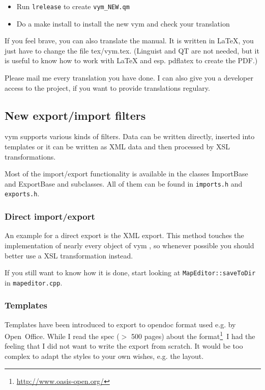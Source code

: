 \documentclass[12pt,a4paper]{article}
\newcommand{\vym}{{\sc vym }}
\begin{document}
\begin{appendix}
\begin{itemize}
	\item Run {\tt lrelease} to create {\tt vym\_NEW.qm}

	\item Do a make install to install the new vym and check your translation
\end{itemize}

If you feel brave, you can also translate the manual. It is written in
LaTeX, you just have to change the file tex/vym.tex. (Linguist and QT
are not needed, but it is useful to know how to work with LaTeX and esp.
pdflatex to create the PDF.) 

Please mail me every translation you have done. I can also give you a
developer access to the project, if you want to provide translations
regulary.  

\subsection{New export/import filters}
\vym supports various kinds of filters. Data can be written directly,
inserted into templates or it can be written as XML data and then
processed by XSL transformations. 

Most of the import/export functionality is available in the classes
ImportBase and ExportBase and subclasses. All of them can be found in
{\tt imports.h} and {\tt exports.h}.

\subsubsection*{Direct import/export}
An example for a direct export is the XML export. This method touches
the implementation of nearly every object of \vym, so whenever possible
you should better use a XSL transformation instead.

If you still want to know how it is done, start looking at 
{\tt MapEditor::saveToDir} in {\tt mapeditor.cpp}.

\subsubsection*{Templates}
Templates have been introduced to export to opendoc format used e.g. by
Open~Office. While I read the spec ($>$ 500 pages) about the format\footnote{
\href{http://www.oasis-open.org/}{http://www.oasis-open.org/}}\ 
I had the feeling that I did not want to write the export from scratch. 
It would be too complex to adapt the styles to your own wishes, e.g. the
layout.


\end{appendix}
\end{document}
